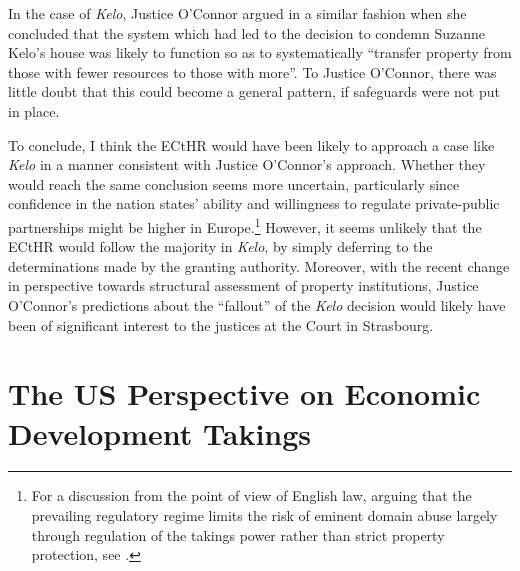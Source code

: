 In the case of {\it Kelo}, Justice O'Connor argued in a similar fashion when she concluded that the system which had led to the decision to condemn Suzanne Kelo's house was likely to function so as to systematically ``transfer property from those with fewer resources to those with more''. To Justice O'Connor, there was little doubt that this could become a general pattern, if safeguards were not put in place. %

To conclude, I think the ECtHR would have been likely to approach a case like {\it Kelo} in a manner consistent with Justice O'Connor's approach. Whether they would reach the same conclusion seems more uncertain, particularly since confidence in the nation states' ability and willingness to regulate private-public partnerships might be higher in Europe.\footnote{For a discussion from the point of view of English law, arguing that the prevailing regulatory regime limits the risk of eminent domain abuse largely through regulation of the takings power rather than strict property protection, see \cite{allen08}.} However, it seems unlikely that the ECtHR would follow the majority in {\it Kelo}, by simply deferring to the determinations made by the granting authority. Moreover, with the recent change in perspective towards structural assessment of property institutions, Justice O'Connor's predictions about the ``fallout'' of the {\it Kelo} decision would likely have been of significant interest to the justices at the Court in Strasbourg.

\section{The US Perspective on Economic Development Takings}\label{sec:us}

